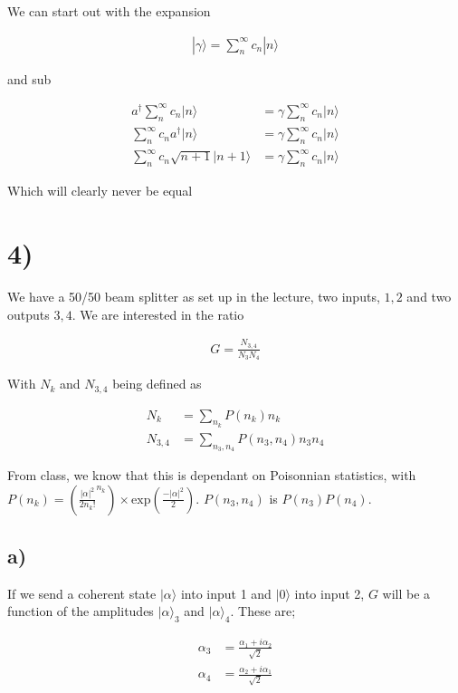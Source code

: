 \documentclass{article}
\newcommand{\p}[1]{\left(#1\right)}
\newcommand{\bra}[1]{|#1\rangle}
\begin{document}
We can start out with the expansion

\begin{align*}
    \bra{\gamma}=\sum_{n}^{\infty}c_n\bra{n}
\end{align*}

and sub

\begin{align*}
    a^\dagger\sum_{n}^{\infty}c_n\bra{n}&=\gamma\sum_{n}^{\infty}c_n\bra{n}\\[1em]
    \sum_{n}^{\infty}c_na^\dagger\bra{n}&=\gamma\sum_{n}^{\infty}c_n\bra{n}\\[1em]
    \sum_{n}^{\infty}c_n\sqrt{n+1}\bra{n+1}&=\gamma\sum_{n}^{\infty}c_n\bra{n}
\end{align*}

Which will clearly never be equal

\section*{4)}
We have a 50/50 beam splitter as set up in the lecture, two inputs, $1, 2$ and two outputs $3, 4$. We are interested in the ratio

\begin{align*}
    G=\frac{N_{3,4}}{N_3N_4}
\end{align*}

With $N_k$ and $N_{3,4}$ being defined as

\begin{align*}
    N_k&=\sum_{n_k}P(n_k)n_k\\[1em]
    N_{3,4}&=\sum_{n_3,n_4}P(n_3,n_4)n_3n_4
\end{align*}

From class, we know that this is dependant on Poisonnian statistics, with $P(n_k)=\p{\frac{|\alpha|^2}{2n_k!}^{n_k}}\times\text{exp}\p{\frac{-|\alpha|^2}{2}}$. $P(n_3,n_4)$ is $P(n_3)P(n_4)$.

\subsection*{a)}
If we send a coherent state $\bra{\alpha}$ into input 1 and $\bra{0}$ into input 2, $G$ will be a function of the amplitudes $\bra{\alpha}_3$ and $\bra{\alpha}_4$. These are;

\begin{align*}
    \alpha_3&=\frac{\alpha_1+i\alpha_2}{\sqrt{2}}\\[1em]
    \alpha_4&=\frac{\alpha_2+i\alpha_1}{\sqrt{2}}
\end{align*}
\end{document}
